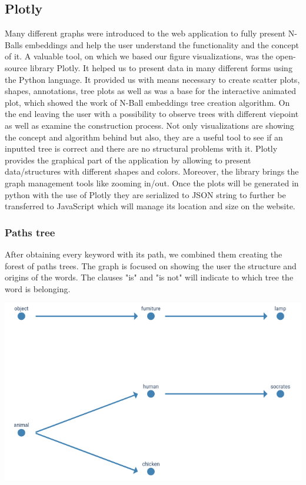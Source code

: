 \documentclass[]{article}
\begin{document}
\subsection{Plotly} \label{plotly}
Many different graphs were introduced to the web application to fully present N-Balls embeddings and help the user understand the functionality and the concept of it. A valuable tool, on which we based our figure visualizations, was the open-source library Plotly. It helped us to present data in many different forms using the Python language. It provided us with means necessary to create scatter plots, shapes, annotations, tree plots as well as was a base for the interactive animated plot, which showed the work of N-Ball embeddings tree creation algorithm. On the end leaving the user with a possibility to observe trees with different viepoint as well as examine the construction process. Not only visualizations are showing the concept and algorithm behind but also, they are a useful tool to see if an inputted tree is correct and there are no structural problems with it. Plotly provides the graphical part of the application by allowing to present data/structures with different shapes and colors. Moreover, the library brings the graph management tools like zooming in/out. Once the plots will be generated in python with the use of Plotly they are serialized to JSON string to further be transferred to JavaScript which will manage its location and size on the website. 


\subsubsection{Paths tree}
After obtaining every keyword with its path, we combined them creating the forest of paths trees. The graph is focused on showing the user the structure and origins of the words. The clauses "is" and "is not" will indicate to which tree the word is belonging.

\includegraphics[width=\textwidth]{res/tree_forest.png}
\end{document}
